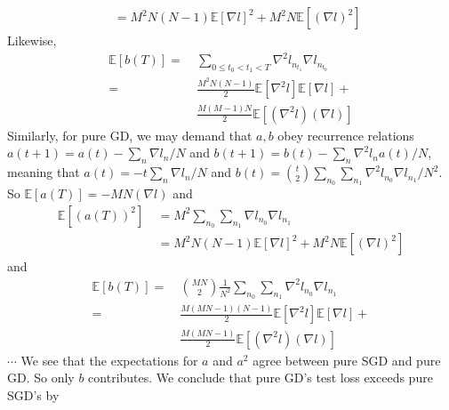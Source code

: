 \documentclass[openany, notitlepage, justified]{tufte-book}
\theoremstyle{plain}
\theoremstyle{definition}
\newcommand{\expct}[1]{\mathbb{E}\left[#1\right]}
\begin{document}
\begin{shaded}
\begin{align*}
                    ~&= 
                    M^2N(N-1)   \expct{\nabla l}^2 +
                    M^2N        \expct{(\nabla l)^2}
                \end{align*}
                Likewise, 
                \begin{align*}
                    \expct{b(T)}
                    = 
                    ~&\sum_{0\leq t_0 < t_1 < T} \nabla^2 l_{n_{t_1}} \nabla l_{n_{t_0}} \\
                    =
                    ~&\frac{M^2N(N-1)}{2} \expct{\nabla^2 l} \expct{\nabla l} + \\
                    ~&\frac{M(M-1)N}{2}  \expct{(\nabla^2 l) (\nabla l)} 
                \end{align*}
                Similarly, for pure GD, we may demand that $a, b$ obey recurrence
                relations $a(t+1) = a(t) - \sum_n \nabla l_n/N$ and
                $b(t+1) = b(t) - \sum_n \nabla^2 l_n a(t)/N$, meaning that
                $a(t) = -t \sum_n \nabla l_n/N$ and
                $b(t) = {t \choose 2} \sum_{n_0} \sum_{n_1} \nabla^2 l_{n_0} \nabla l_{n_1}/N^2$.
                So $\expct{a(T)} = -MN(\nabla l)$ and
                \begin{align*}
                    \expct{(a(T))^2}
                    ~&=
                    M^2 
                    \sum_{n_0} \sum_{n_1} \nabla l_{n_0} \nabla l_{n_1} \\
                    ~&= 
                    M^2 N(N-1)  \expct{\nabla l}^2 + 
                    M^2 N       \expct{(\nabla l)^2}
                \end{align*}
                and
                \begin{align*}
                    \expct{b(T)}
                    = 
                    ~&{MN \choose 2}\frac{1}{N^2}
                    \sum_{n_0} \sum_{n_1} \nabla^2 l_{n_0} \nabla l_{n_1} \\
                    =
                    ~&\frac{M(MN-1)(N-1)}{2} \expct{\nabla^2 l} \expct{\nabla l} + \\
                    ~&\frac{M(MN-1)}{2}      \expct{(\nabla^2 l) (\nabla l)} 
                \end{align*}
                $\cdots$
                We see that the expectations for $a$ and $a^2$ agree
                between pure SGD and pure GD.  So only $b$ contributes.  We
                conclude that pure GD's test loss exceeds pure SGD's by
            \end{shaded}
\end{document}

